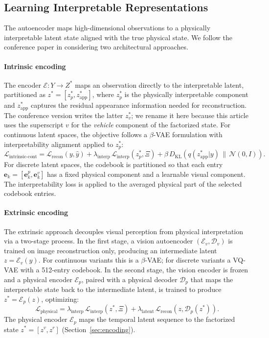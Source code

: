 \documentclass[preprint,12pt]{elsarticle}
\newcommand{\zv}{z^{v}}      %
\newcommand{\zr}{z^{r}}      %
\newcommand{\zstar}{z^{*}}   %
\begin{document}
\subsection{Learning Interpretable Representations}\label{sec:repr_learning}

The autoencoder maps high-dimensional observations to a physically interpretable
latent state aligned with the true physical state.
We follow the conference paper in considering two architectural approaches.

\paragraph{Intrinsic encoding}
The encoder $\mathcal{E}: Y \rightarrow Z^*$ maps an observation directly to the
interpretable latent, partitioned as $\zstar = [z_p^*, z_{\mathrm{app}}^*]$, where
$z_p^*$ is the physically interpretable component and $z_{\mathrm{app}}^*$ captures
the residual appearance information needed for reconstruction. The conference
version writes the latter $z_v^*$; we rename it here because this article uses the
superscript $v$ for the \emph{vehicle} component of the factorized state.
For continuous latent spaces, the objective follows a $\beta$-VAE formulation with
interpretability alignment applied to $z_p^*$:
\begin{equation}
\mathcal{L}_{\mathrm{intrinsic\text{-}cont}} =
    \mathcal{L}_{\mathrm{recon}}(y, \hat{y})
    + \lambda_{\mathrm{interp}}\,\mathcal{L}_{\mathrm{interp}}(z_p^*, \Xi)
    + \beta\, D_{\mathrm{KL}}\!\left(q(z_{\mathrm{app}}^*|y)\,\|\,\mathcal{N}(0,I)\right).
\end{equation}
For discrete latent spaces, the codebook is partitioned so that each entry
$\mathbf{e}_k = [\mathbf{e}_k^p, \mathbf{e}_k^v]$ has a fixed physical component
and a learnable visual component.
The interpretability loss is applied to the averaged physical part of the
selected codebook entries.

\paragraph{Extrinsic encoding}
The extrinsic approach decouples visual perception from physical interpretation
via a two-stage process.
In the first stage, a vision autoencoder $(\mathcal{E}_v, \mathcal{D}_v)$ is
trained on image reconstruction only, producing an intermediate latent
$z = \mathcal{E}_v(y)$.
For continuous variants this is a $\beta$-VAE; for discrete variants a VQ-VAE
with a 512-entry codebook.
In the second stage, the vision encoder is frozen and a physical encoder
$\mathcal{E}_p$, paired with a physical decoder $\mathcal{D}_p$ that maps the
interpretable state back to the intermediate latent, is trained to produce
$\zstar = \mathcal{E}_p(z)$, optimizing:
\begin{equation}
    \mathcal{L}_{\mathrm{physical}} =
    \lambda_{\mathrm{interp}}\,\mathcal{L}_{\mathrm{interp}}(\zstar, \Xi)
    + \lambda_{\mathrm{latent}}\,\mathcal{L}_{\mathrm{recon}}\!\left(z,
    \mathcal{D}_p(\zstar)\right).
\end{equation}
The physical encoder $\mathcal{E}_p$ maps the temporal latent sequence to the
factorized state $\zstar = [\zv, \zr]$ (Section~\ref{sec:encoding}).
\end{document}

